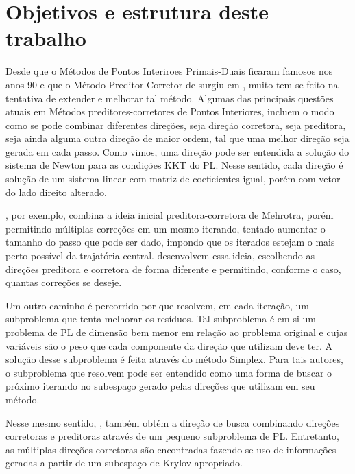 \section{Objetivos e estrutura deste trabalho}




Desde que o Métodos de Pontos Interiroes Primais-Duais ficaram famosos nos anos 90 e que o Método Preditor-Corretor de \textcite{Mehrotra:1992wr} surgiu em \citeyear{Mehrotra:1992wr}, muito tem-se feito na tentativa de extender e melhorar tal método. Algumas das principais questões atuais em Métodos preditores-corretores de Pontos Interiores, incluem o modo como se pode combinar diferentes direções, seja direção corretora, seja preditora, seja ainda alguma outra direção de maior ordem, tal que uma melhor direção seja gerada em cada passo.  Como vimos, uma direção pode ser entendida a solução do sistema de Newton para as condições KKT do \ac{PL}. Nesse sentido, cada direção é solução de um sistema linear com matriz de coeficientes igual, porém com vetor do lado direito alterado.


\textcite{Gondzio:1996uw}, por exemplo, combina a ideia inicial preditora-corretora de Mehrotra, porém permitindo múltiplas correções em um mesmo iterando, tentado aumentar o tamanho do passo que pode ser dado, impondo que os iterados estejam o mais perto possível da trajatória central. \textcite{Colombo:2008ia} desenvolvem essa ideia, escolhendo as direções preditora e corretora de forma diferente e permitindo, conforme o caso, quantas correções se deseje. 

Um outro caminho é percorrido por \textcite{Jarre:1999tl} que resolvem, em cada iteração, um subproblema que tenta melhorar os resíduos. Tal subproblema  é em si um problema de PL de dimensão bem  menor em relação ao problema original e cujas variáveis são o peso que cada componente da direção que utilizam deve ter. A solução desse subproblema é feita através do método Simplex. Para tais autores, o subproblema que resolvem pode ser entendido como uma forma de buscar o próximo iterando no subespaço gerado pelas direções que utilizam em seu método.


Nesse mesmo sentido, \textcite{Mehrotra:2005do}, também obtém a direção de busca combinando direções corretoras e preditoras  através de um pequeno subproblema de \ac{PL}. Entretanto, as múltiplas  direções corretoras são encontradas fazendo-se uso de informações geradas a partir de um  subespaço de Krylov apropriado.



